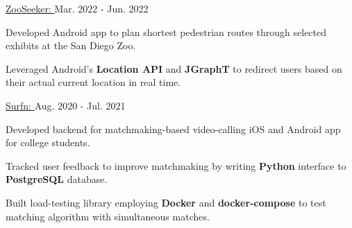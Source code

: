 
\begin{cventries}

  \cvproject
  {\href{https://github.com/Auroric/ZooSeeker}{ZooSeeker: }} %
  {Mar. 2022 - Jun. 2022} %
  {
    \begin{cvitems} %
      \item {Developed Android app to plan shortest pedestrian routes through selected exhibits at the San Diego Zoo.}
      \item {Leveraged Android's \textbf{Location API} and \textbf{JGraphT} to redirect users based on their actual current location in real time.}
    \end{cvitems}
  }

  \cvproject
    {\href{https://surfn.app}{Surfn: }} %
    {Aug. 2020 - Jul. 2021} %
    {
      \begin{cvitems} %
        \item {Developed backend for matchmaking-based video-calling iOS and Android app for college students.}
        \item {Tracked user feedback to improve matchmaking by writing \textbf{Python} interface to \textbf{PostgreSQL} database.}
        \item {Built load-testing library employing \textbf{Docker} and \textbf{docker-compose} to test matching algorithm with simultaneous matches.}
      \end{cvitems}
    }
  
\end{cventries}